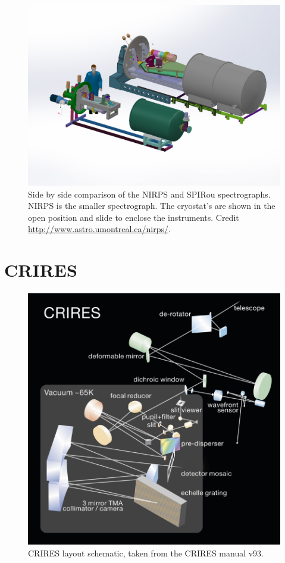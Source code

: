 \begin{figure}
    \centering
    \includegraphics[width=0.7\linewidth]{figures/spectroscopy/NIRPS-vs-SPIROU}
    \caption[Side by side comparison of the {NIRPS} and {SPIRou} spectrographs.]{Side by side comparison of the {NIRPS} and {SPIRou} spectrographs.
    {NIRPS} is the smaller spectrograph.
    The cryostat's are shown in the open position and slide to enclose the instruments.
    Credit \href{http://www.astro.umontreal.ca/nirps/}{http://www.astro.umontreal.ca/nirps/}.}
    \label{fig:nirps-vs-spirou}
\end{figure}

\section{CRIRES}
\label{sec:CRIRES}

\begin{figure}
    \centering
    \includegraphics[width=0.5\linewidth]{figures/spectroscopy/CRIRES_schematic.pdf}
    \caption[CRIRES layout schematic.]{CRIRES layout schematic, taken from the {CRIRES} manual v93.}
    \label{fig:criresschematic}
\end{figure}

